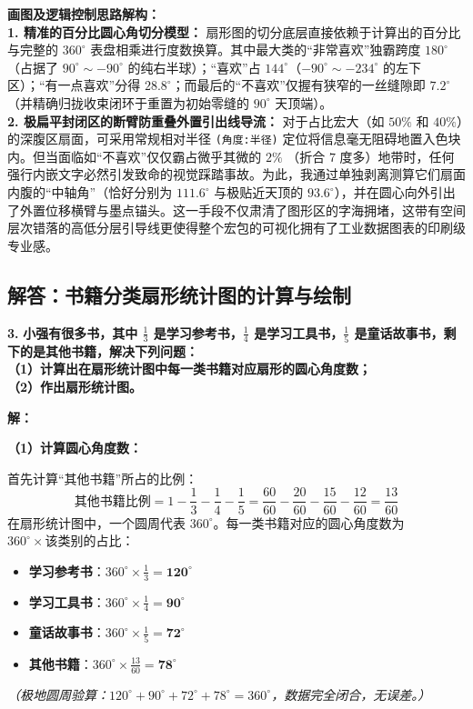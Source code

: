 {\small\color{blue!70!black}
\textbf{画图及逻辑控制思路解构：}\\
\textbf{1. 精准的百分比圆心角切分模型：} 扇形图的切分底层直接依赖于计算出的百分比与完整的 $360^\circ$ 表盘相乘进行度数换算。其中最大类的“非常喜欢”独霸跨度 $180^\circ$（占据了 $90^\circ \sim -90^\circ$ 的纯右半球）；“喜欢”占 $144^\circ$（$-90^\circ \sim -234^\circ$ 的左下区）；“有一点喜欢”分得 $28.8^\circ$；而最后的“不喜欢”仅握有狭窄的一丝缝隙即 $7.2^\circ$（并精确归拢收束闭环于重置为初始零缝的 $90^\circ$ 天顶端）。\\
\textbf{2. 极扁平封闭区的断臂防重叠外置引出线导流：} 对于占比宏大（如 $50\%$ 和 $40\%$）的深腹区扇面，可采用常规相对半径 \texttt{(角度:半径)} 定位将信息毫无阻碍地置入色块内。但当面临如“不喜欢”仅仅霸占微乎其微的 $2\%$ （折合 $7$ 度多）地带时，任何强行内嵌文字必然引发致命的视觉踩踏事故。为此，我通过单独剥离测算它们扇面内腹的“中轴角”（恰好分别为 $111.6^\circ$ 与极贴近天顶的 $93.6^\circ$），并在圆心向外引出了外置位移横臂与墨点锚头。这一手段不仅肃清了图形区的字海拥堵，这带有空间层次错落的高低分层引导线更使得整个宏包的可视化拥有了工业数据图表的印刷级专业感。
}

\newpage

\newpage

\subsection{解答：书籍分类扇形统计图的计算与绘制}

\vspace{0.6cm}

\textbf{\LARGE 3.} \textbf{小强有很多书，其中 $\frac{1}{3}$ 是学习参考书，$\frac{1}{4}$ 是学习工具书，$\frac{1}{5}$ 是童话故事书，剩下的是其他书籍，解决下列问题：\\
（1）计算出在扇形统计图中每一类书籍对应扇形的圆心角度数；\\
（2）作出扇形统计图。}

\vspace{0.4cm}
\textbf{解：}

\textbf{（1）计算圆心角度数：}

首先计算“其他书籍”所占的比例：
\[
\text{其他书籍比例} = 1 - \frac{1}{3} - \frac{1}{4} - \frac{1}{5} = \frac{60}{60} - \frac{20}{60} - \frac{15}{60} - \frac{12}{60} = \frac{13}{60}
\]
在扇形统计图中，一个圆周代表 $360^\circ$。每一类书籍对应的圆心角度数为 $360^\circ \times \text{该类别的占比}$：
\begin{itemize}
    \item \textbf{学习参考书}：$360^\circ \times \frac{1}{3} = \textbf{120}^\circ$
    \item \textbf{学习工具书}：$360^\circ \times \frac{1}{4} = \textbf{90}^\circ$
    \item \textbf{童话故事书}：$360^\circ \times \frac{1}{5} = \textbf{72}^\circ$
    \item \textbf{其他书籍}：$360^\circ \times \frac{13}{60} = \textbf{78}^\circ$
\end{itemize}
\textit{（极地圆周验算：$120^\circ + 90^\circ + 72^\circ + 78^\circ = 360^\circ$，数据完全闭合，无误差。）}

